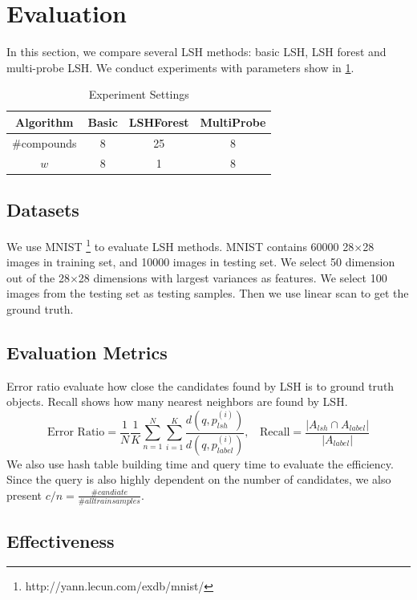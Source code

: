 \section{Evaluation}
In this section, we compare several LSH methods: basic LSH, LSH forest and multi-probe LSH.
We conduct experiments with parameters show in \cref{tbl:exp-settings}.

\begin{table}
  \caption{Experiment Settings}
  \begin{tabular}{cccc}
		\hline
		Algorithm & Basic & LSHForest & MultiProbe  \\ \hline
		\#compounds & 8 & 25 & 8 \\\hline
		$w$ & 8 & 1 & 8 \\\hline
	\end{tabular}
	\label{tbl:exp-settings}
\end{table}
\subsection{Datasets}
We use MNIST \footnote{http://yann.lecun.com/exdb/mnist/} to evaluate LSH methods. MNIST contains 60000 28$\times$28 images in training set, and 10000 images in testing set.
We select 50 dimension out of the 28$\times$28 dimensions with largest variances as features.
We select 100 images from the testing set as testing samples.
Then we use linear scan to get the ground truth.
\subsection{Evaluation Metrics}
Error ratio evaluate how close the candidates found by LSH is to ground truth objects.
Recall shows how many nearest neighbors are found by LSH.
$$
\text{Error Ratio}=\frac{1}{N}\frac{1}{K}\sum_{n=1}^{N}\sum_{i=1}^{K}\frac{d(q, p_{lsh}^{(i)})}{d(q, p_{label}^{(i)})}, \>\>\>\>
\text{Recall}=\frac{|A_{lsh}\cap A_{label}|}{|A_{label}|}
$$
We also use hash table building time and query time to evaluate the efficiency. Since the query is also highly dependent on the number of candidates, we also present $c/n=\frac{\#candiate}{\#all train samples}$.

\subsection{Effectiveness}

